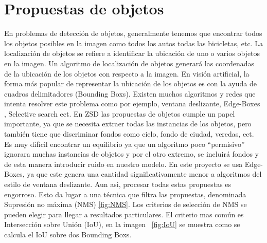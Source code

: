\section{Propuestas de objetos}
En problemas de detección de objetos, generalmente tenemos que encontrar todos los objetos posibles en la imagen como todos los autos todas las bicicletas, etc. La localización de objetos se refiere a identificar la ubicación de uno o varios objetos en la imagen. Un algoritmo de localización de objetos generará las coordenadas de la ubicación de los objetos con respecto a la imagen. En visión artificial, la forma más popular de representar la ubicación de los objetos es con la ayuda de cuadros delimitadores (Bounding Boxs). Existen muchos algoritmos y redes que intenta resolver este problema como por ejemplo, ventana deslizante, Edge-Boxes \cite{zitnick2014edge}, Selective search \cite{uijlings2013selective} ect. En ZSD las propuestas de objetos cumple un papel importante, ya que se necesita extraer todas las instancias de los objetos, pero también tiene que discriminar fondos como cielo, fondo de ciudad, veredas, ect. Es muy difícil encontrar un equilibrio ya que un algoritmo poco ``permisivo'' ignorara muchas instancias de objetos y por el otro extremo, se incluirá fondos y de esta manera introducir ruido en nuestro modelo. En este proyecto se usa Edge-Boxes, ya que este genera una cantidad significativamente menor a algoritmos del estilo de ventana deslizante. Aun asi, procesar todas estas propuestas es engorroso. Esto da lugar a una técnica que filtra las propuestas, denominada Supresión no máxima (NMS) \ref{fig:NMS}. Los criterios de selección de NMS se pueden elegir para llegar a resultados particulares. El criterio mas común es Intersección sobre Unión (IoU), en la imagen ~\ref{fig:IoU} se muestra como se calcula el IoU sobre dos Bounding Boxs.


